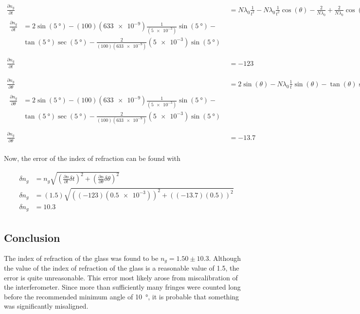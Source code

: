 \documentclass[12pt]{article}
\begin{document}
\begin{align*}
  \frac{\partial n_g}{\partial t} &= N \lambda_0 \frac{1}{t^2} - N \lambda_0
                                  \frac{1}{t^2} \cos{(\theta)} - \frac{2}{N
                                  \lambda_0} + \frac{2}{N \lambda_0} \cos{(\theta)} \\
\begin{split}  
  \frac{\partial n_g}{\partial t} &= 2 \sin{(\SI{5}{\degree})} - (100)
  (\num{633e-9}) \frac{1}{(\num{5e-3})} \sin{(\SI{5}{\degree})} - \\ &
  \tan{(\SI{5}{\degree})} \sec{(\SI{5}{\degree})} - \frac{2}{(100)
    (\num{633e-9})} (\num{5e-3}) \sin{(\SI{5}{\degree})} \\
  \end{split}\\
\frac{\partial n_g}{\partial t} &= -123
\end{align*}

\begin{align*}
  \frac{\partial n_g}{\partial \theta} &= 2 \sin{(\theta)} - N \lambda_0
  \frac{1}{t} \sin{(\theta)} - \tan{(\theta)} \sec{(\theta)} - \frac{2}{N
    \lambda_0} t \sin{(\theta)} \\
  \begin{split}
    \frac{\partial n_g}{\partial \theta} &= 2 \sin{(\SI{5}{\degree})} - (100)
    (\num{633e-9}) \frac{1}{(\num{5e-3})} \sin{(\SI{5}{\degree})} - \\ &
    \tan{(\SI{5}{\degree})} \sec{(\SI{5}{\degree})} -
    \frac{2}{(100)(\num{633e-9})} (\num{5e-3}) \sin{(\SI{5}{\degree})} \\
  \end{split} \\
  \frac{\partial n_g}{\partial \theta} &= -13.7 \\
\end{align*}

Now, the error of the index of refraction can be found with

\begin{align*}
  \delta n_g &= n_g \sqrt{\left( \frac{\partial n}{\partial t} \delta t \right) ^ 2 +
             \left( \frac{\partial n}{\partial \theta} \delta \theta \right) ^ 2} \\
  \delta n_g &= (1.5) \sqrt{\left( (-123) (\num{0.5e-3}) \right) ^ 2 + \left( (-13.7)
  (0.5) \right) ^ 2} \\
  \delta n_g &= 10.3 \\
\end{align*}

\subsection{Conclusion}

\qq The index of refraction of the glass was found to be
\(n_g = 1.50 \pm 10.3\). Although the value of the index of refraction of the
glass is a reasonable value of 1.5, the error is quite unreasonable. This error
most likely arose from miscalibration of the interferometer. Since more than
sufficiently many fringes were counted long before the recommended minimum angle
of \SI{10}{\degree}, it is probable that something was significantly misaligned.

\end{document}
